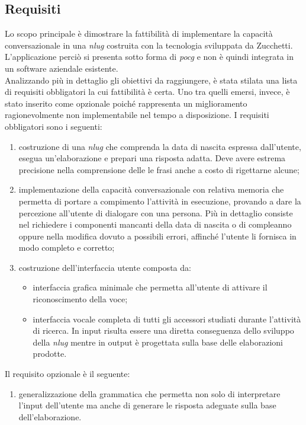 	\subsection{Requisiti}
	Lo scopo principale è dimostrare la fattibilità di implementare la capacità conversazionale in una \emph{\gls{nlug}} costruita con la tecnologia sviluppata da Zucchetti. L'applicazione perciò si presenta sotto forma di \emph{\gls{pocg}} e non è quindi integrata in un software aziendale esistente. \\
	Analizzando più in dettaglio gli obiettivi da raggiungere, è stata stilata una lista di requisiti obbligatori la cui fattibilità è certa. Uno tra quelli emersi, invece, è stato inserito come opzionale poiché rappresenta un miglioramento ragionevolmente non implementabile nel tempo a disposizione.
	I requisiti obbligatori sono i seguenti:
	\begin{enumerate}
		\item costruzione di una \emph{\gls{nlug}} che comprenda la data di nascita espressa dall'utente, esegua un'elaborazione e prepari una risposta adatta. Deve avere estrema precisione nella comprensione delle le frasi anche a costo di rigettarne alcune;
		\item implementazione della capacità conversazionale con relativa memoria che permetta di portare a compimento l'attività in esecuzione, provando a dare la percezione all'utente di dialogare con una persona. Più in dettaglio consiste nel richiedere i componenti mancanti della data di nascita o di compleanno oppure nella modifica dovuto a possibili errori, affinché l'utente li fornisca in modo completo e corretto;
		\item costruzione dell'interfaccia utente composta da:
		\begin{itemize}
			\item interfaccia grafica minimale che permetta all'utente di attivare il riconoscimento della voce;
			\item interfaccia vocale completa di tutti gli accessori studiati durante l'attività di ricerca. In input risulta essere una diretta conseguenza dello sviluppo della \emph{\gls{nlug}} mentre in output è progettata sulla base delle elaborazioni prodotte.
		\end{itemize}
	\end{enumerate}
	Il requisito opzionale è il seguente:
	\begin{enumerate}
		\item generalizzazione della grammatica che permetta non solo di interpretare l'input dell'utente ma anche di generare le risposta adeguate sulla base dell'elaborazione.
	\end{enumerate}
